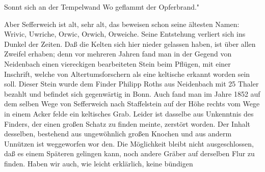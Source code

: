

Sonnt sich an der Tempelwand\ob
Wo geflammt der Opferbrand."

%
Aber Sefferweich ist alt, sehr alt, das beweisen\ob
schon seine ältesten Namen: Wrivic, Uwriche, Orwic,\ob
Orwich, Orweiche. Seine Entstehung verliert sich ins\ob
Dunkel der Zeiten. Daß die Kelten sich hier nieder\ohb
gelassen haben, ist über allen Zweifel erhaben;\ob
{}%
denn vor mehreren Jahren fand man in der Gegend\ob
von Neidenbach einen viereckigen bearbeiteten\ob
Stein beim Pflügen, mit einer Inschrift, welche\ob
von Altertumsforschern als eine keltische erkannt\ob
worden sein soll. Dieser Stein wurde\ob
{}%
dem Finder Philipp Roths aus Neidenbach\ob
mit 25 Thaler bezahlt und befindet sich gegenwärtig\ob
in Bonn. Auch fand man im Jahre 1852 auf\ob
dem selben Wege von Sefferweich nach Staffelstein\ob
auf der Höhe rechts vom Wege in einem Acker\ohb
felde ein keltisches Grab. Leider ist dasselbe aus\ob
Unkenntnis des Finders, der einen großen Schatz\ob
zu finden meinte, zerstört worden. Der Inhalt\ob
desselben, bestehend aus ungewöhnlich großen Knochen\ob
und aus anderm Unnützen ist weggeworfen wor\ohb
den. Die Möglichkeit bleibt nicht ausgeschlossen, daß\ob
es einem Späteren gelingen kann, noch andere\ob
Gräber auf derselben Flur zu finden. Haben\ob
wir auch, wie leicht erklärlich, keine bündigen
\pend
